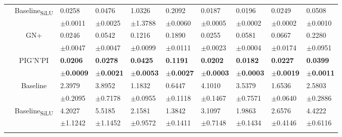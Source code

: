 \documentclass{article}
\newcommand{\pignpi}{PIG'N'PI\xspace}
\newcommand{\lemos}{GN+\xspace}
\begin{document}
\begin{table}[h!]
{\begin{tabularx}{\textwidth}{ccXXXXXXXX}
        &\multirow{2}{*}{{Baseline\textsubscript{SiLU}}}
        &0.0258 & 0.0476 & 1.0326 & 0.2092 & 0.0187 & 0.0196 & 0.0249 & 0.0508\\
        &&\scriptsize$\pm$0.0011 & \scriptsize $\pm$0.0025 & \scriptsize $\pm$1.3788 & \scriptsize $\pm$0.0060 & \scriptsize $\pm$0.0005 & \scriptsize $\pm$0.0002 & \scriptsize $\pm$0.0002 & \scriptsize $\pm$0.0010\\
        \cline{3-10}\rule{0pt}{2.3ex}
        
        &\multirow{2}{*}{\lemos}
        & 0.0246 & 0.0542 & 0.1216 & 0.1890 & 0.0255 & 0.0581 & 0.0667 & 0.2280\\
        &&\scriptsize$\pm$0.0047&\scriptsize$\pm$0.0047&\scriptsize$\pm$0.0099&\scriptsize$\pm$0.0111&\scriptsize$\pm$0.0023&\scriptsize$\pm$0.0004&\scriptsize$\pm$0.0174&\scriptsize$\pm$0.0951\\
        \cline{3-10}\rule{0pt}{2.3ex}

        &\multirow{2}{*}{\pignpi}
        &\textbf{0.0206} & \textbf{0.0278} & \textbf{0.0425} & \textbf{0.1191} & \textbf{0.0202} & \textbf{0.0182} & \textbf{0.0227} & \textbf{0.0399}\\
        &&\scriptsize\textbf{$\pm$0.0009} & \scriptsize \textbf{$\pm$0.0021} & \scriptsize \textbf{$\pm$0.0053} & \scriptsize \textbf{$\pm$0.0027} & \scriptsize \textbf{$\pm$0.0003} & \scriptsize \textbf{$\pm$0.0003} & \scriptsize \textbf{$\pm$0.0019} & \scriptsize \textbf{$\pm$0.0011}\\
        \hline\rule{0pt}{2.3ex}
    
        \multirow{8}{*}{\textsf{MAE\textsubscript{ef}}}
        &\multirow{2}{*}{Baseline}
        &2.3979 & 3.8952 & 1.1832 & 0.6447 & 4.1010 & 3.5379 & 1.6536 & 2.5803\\
        &&\scriptsize$\pm$0.2095 & \scriptsize $\pm$0.7178 & \scriptsize $\pm$0.0955 & \scriptsize $\pm$0.1118 & \scriptsize $\pm$0.1467 & \scriptsize $\pm$0.7571 & \scriptsize $\pm$0.0640 & \scriptsize $\pm$0.2886\\
        \cline{3-10}\rule{0pt}{2.3ex}

        &\multirow{2}{*}{{Baseline\textsubscript{SiLU}}}
        &4.2027 & 5.5185 & 2.1581 & 1.3842 & 3.1097 & 1.9863 & 2.6576 & 4.4222\\
        &&\scriptsize$\pm$1.1242 & \scriptsize $\pm$1.1452 & \scriptsize $\pm$0.9572 & \scriptsize $\pm$0.1411 & \scriptsize $\pm$0.7148 & \scriptsize $\pm$0.1434 & \scriptsize $\pm$0.4146 & \scriptsize $\pm$0.6116\\
        \cline{3-10}\rule{0pt}{2.3ex}
        

\end{tabularx}}
\end{table}
\end{document}
